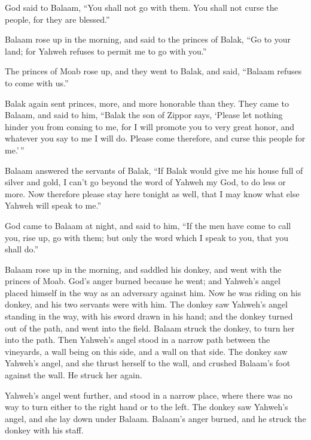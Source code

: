  God said to Balaam, ``You shall not go with them. You
shall not curse the people, for they are blessed.''

 Balaam rose up in the morning, and said to the princes of
Balak, ``Go to your land; for Yahweh refuses to permit me to go with
you.''

 The princes of Moab rose up, and they went to Balak, and
said, ``Balaam refuses to come with us.''

 Balak again sent princes, more, and more honorable than
they.  They came to Balaam, and said to him, ``Balak the
son of Zippor says, `Please let nothing hinder you from coming to me,
 for I will promote you to very great honor, and whatever
you say to me I will do. Please come therefore, and curse this people
for me.'\,''

 Balaam answered the servants of Balak, ``If Balak would
give me his house full of silver and gold, I can't go beyond the word of
Yahweh my God, to do less or more.  Now therefore please
stay here tonight as well, that I may know what else Yahweh will speak
to me.''

 God came to Balaam at night, and said to him, ``If the men
have come to call you, rise up, go with them; but only the word which I
speak to you, that you shall do.''

 Balaam rose up in the morning, and saddled his donkey, and
went with the princes of Moab.  God's anger burned because
he went; and Yahweh's angel placed himself in the way as an adversary
against him. Now he was riding on his donkey, and his two servants were
with him.  The donkey saw Yahweh's angel standing in the
way, with his sword drawn in his hand; and the donkey turned out of the
path, and went into the field. Balaam struck the donkey, to turn her
into the path.  Then Yahweh's angel stood in a narrow path
between the vineyards, a wall being on this side, and a wall on that
side.  The donkey saw Yahweh's angel, and she thrust
herself to the wall, and crushed Balaam's foot against the wall. He
struck her again.

 Yahweh's angel went further, and stood in a narrow place,
where there was no way to turn either to the right hand or to the left.
 The donkey saw Yahweh's angel, and she lay down under
Balaam. Balaam's anger burned, and he struck the donkey with his staff.

